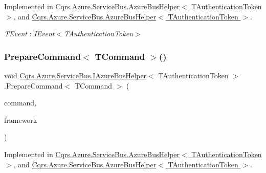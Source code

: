 Implemented in \hyperlink{classCqrs_1_1Azure_1_1ServiceBus_1_1AzureBusHelper_ab0f6ff2ee04ad3b58e6713caebd3b560_ab0f6ff2ee04ad3b58e6713caebd3b560}{Cqrs.\+Azure.\+Service\+Bus.\+Azure\+Bus\+Helper$<$ T\+Authentication\+Token $>$}, and \hyperlink{classCqrs_1_1Azure_1_1ServiceBus_1_1AzureBusHelper_ab0f6ff2ee04ad3b58e6713caebd3b560_ab0f6ff2ee04ad3b58e6713caebd3b560}{Cqrs.\+Azure.\+Service\+Bus.\+Azure\+Bus\+Helper$<$ T\+Authentication\+Token $>$}.

\begin{Desc}
\item[Type Constraints]\begin{description}
\item[{\em T\+Event} : {\em I\+Event$<$T\+Authentication\+Token$>$}]\end{description}
\end{Desc}
\mbox{\label{interfaceCqrs_1_1Azure_1_1ServiceBus_1_1IAzureBusHelper_ad25c4130a4357504cfccba49999493c7_ad25c4130a4357504cfccba49999493c7}} 
\subsubsection{\texorpdfstring{Prepare\+Command$<$ T\+Command $>$()}{PrepareCommand< TCommand >()}}
{\footnotesize\ttfamily void \hyperlink{interfaceCqrs_1_1Azure_1_1ServiceBus_1_1IAzureBusHelper}{Cqrs.\+Azure.\+Service\+Bus.\+I\+Azure\+Bus\+Helper}$<$ T\+Authentication\+Token $>$.Prepare\+Command$<$ T\+Command $>$ (\begin{DoxyParamCaption}\item[{T\+Command}]{command,  }\item[{string}]{framework }\end{DoxyParamCaption})}



Implemented in \hyperlink{classCqrs_1_1Azure_1_1ServiceBus_1_1AzureBusHelper_abdcc74e09f97a259f16d04e2af454002_abdcc74e09f97a259f16d04e2af454002}{Cqrs.\+Azure.\+Service\+Bus.\+Azure\+Bus\+Helper$<$ T\+Authentication\+Token $>$}, and \hyperlink{classCqrs_1_1Azure_1_1ServiceBus_1_1AzureBusHelper_abdcc74e09f97a259f16d04e2af454002_abdcc74e09f97a259f16d04e2af454002}{Cqrs.\+Azure.\+Service\+Bus.\+Azure\+Bus\+Helper$<$ T\+Authentication\+Token $>$}.

